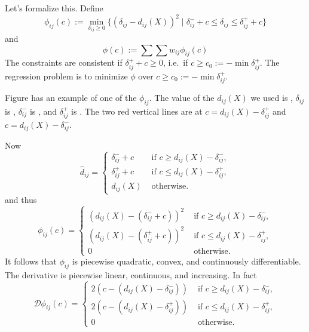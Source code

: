 \documentclass[
  12pt,
]{article}
\begin{document}
Let's formalize this. Define
\begin{equation}
\phi_{ij}(c):=\min_{\delta_{ij}\geq 0}\{(\delta_{ij}-d_{ij}(X))^2\mid \delta^-_{ij}+c\leq\delta_{ij}\leq\delta^+_{ij}+c\}
\label{eq:phiijdef}
\end{equation}
and
\begin{equation}
\phi(c):=\sum\sum w_{ij}\phi_{ij}(c)
\label{eq:phidef}
\end{equation}
The constraints are consistent if \(\delta_{ij}^++c\geq 0\), i.e.~if \(c\geq c_0:=-\min\delta_{ij}^+\).
The regression problem is to minimize \(\phi\) over \(c\geq c_0:=-\min\delta_{ij}^+\).

Figure has an example of one of the \(\phi_{ij}\). The value of the
\(d_{ij}(X)\) we used is , \(\delta_{ij}\) is , \(\delta_{ij}^-\) is , and \(\delta_{ij}^+\) is .
The two red vertical lines
are at \(c=d_{ij}(X)-\delta_{ij}^+\) and \(c=d_{ij}(X)-\delta_{ij}^-\).

Now
\begin{equation}
\hat d_{ij}=\begin{cases}
\delta_{ij}^-+c&\text{ if }c\geq d_{ij}(X)-\delta_{ij}^-,\\
\delta_{ij}^++c&\text{ if }c\leq d_{ij}(X)-\delta_{ij}^+,\\
d_{ij}(X)&\text{ otherwise}.
\end{cases}
\label{eq:solves}
\end{equation}
and thus
\begin{equation}
\phi_{ij}(c)=\begin{cases}
(d_{ij}(X)-(\delta_{ij}^-+c))^2&\text{ if }c\geq d_{ij}(X)-\delta_{ij}^-,\\
(d_{ij}(X)-(\delta_{ij}^++c))^2&\text{ if }c\leq d_{ij}(X)-\delta_{ij}^+,\\
0&\text{ otherwise}.
\end{cases}
\label{eq:funcs}
\end{equation}
It follows that \(\phi_{ij}\) is
piecewise quadratic, convex, and continuously differentiable. The derivative
is piecewise linear, continuous, and increasing. In fact
\begin{equation}
\mathcal{D}\phi_{ij}(c)=\begin{cases}
2(c-(d_{ij}(X)-\delta_{ij}^-))&\text{ if }c\geq d_{ij}(X)-\delta_{ij}^-,\\
2(c-(d_{ij}(X)-\delta_{ij}^+))&\text{ if }c\leq d_{ij}(X)-\delta_{ij}^+,\\
0&\text{ otherwise}.
\end{cases}
\label{eq:derivs}
\end{equation}
\end{document}
